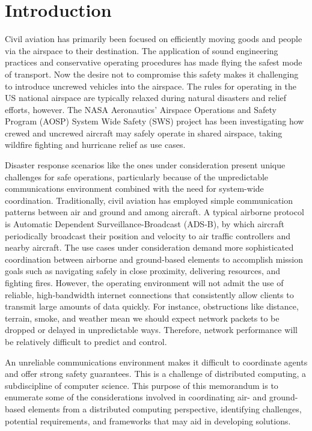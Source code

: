 \section{Introduction}
Civil aviation has primarily been focused on efficiently moving goods
and people via the airspace to their destination. The application of
sound engineering practices and conservative operating procedures has
made flying the safest mode of transport. Now the desire not to
compromise this safety makes it challenging to introduce uncrewed
vehicles into the airspace. The rules for operating in the US national
airspace are typically relaxed during natural disasters and relief
efforts, however. The NASA Aeronautics' Airspace Operations and Safety
Program (AOSP) System Wide Safety (SWS) project has been investigating
how crewed and uncrewed aircraft may safely operate in shared
airspace, taking wildfire fighting and hurricane relief as use cases.

Disaster response scenarios like the ones under consideration present
unique challenges for safe operations, particularly because of the
unpredictable communications environment combined with the need for
system-wide coordination. Traditionally, civil aviation has employed
simple communication patterns between air and ground and among
aircraft. A typical airborne protocol is Automatic Dependent
Surveillance-Broadcast (ADS-B), by which aircraft periodically
broadcast their position and velocity to air traffic controllers and
nearby aircraft. The use cases under consideration demand more
sophisticated coordination between airborne and ground-based elements
to accomplish mission goals such as navigating safely in close
proximity, delivering resources, and fighting fires. However, the
operating environment will not admit the use of reliable,
high-bandwidth internet connections that consistently allow clients to
transmit large amounts of data quickly. For instance, obstructions
like distance, terrain, smoke, and weather mean we should expect
network packets to be dropped or delayed in unpredictable
ways. Therefore, network performance will be relatively difficult to
predict and control.

An unreliable communications environment makes it difficult to
coordinate agents and offer strong safety guarantees. This is a
challenge of distributed computing, a subdiscipline of computer
science. This purpose of this memorandum is to enumerate some of the
considerations involved in coordinating air- and ground-based elements
from a distributed computing perspective, identifying challenges,
potential requirements, and frameworks that may aid in developing
solutions.


